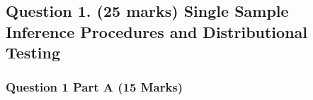 \documentclass[a4paper,12pt]{article}
\begin{document}
\subsection*{Question 1. (25 marks) Single Sample Inference Procedures and Distributional Testing}\label{sec:question-1.-(25-marks)-inference-procedures-and-distributional-testing}
	







\subsubsection*{Question 1 Part A (15 Marks)}
\end{document}
